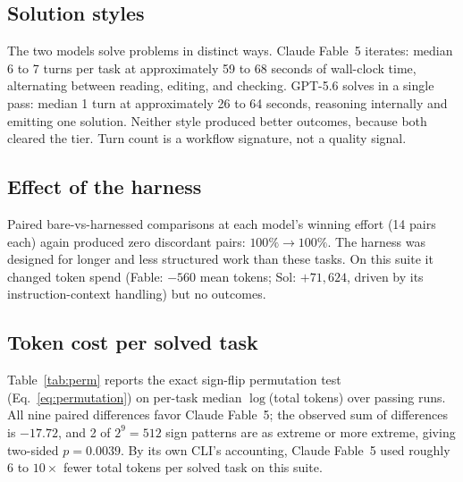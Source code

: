 \documentclass[11pt]{article}
\newcommand{\fable}{Claude Fable~5}
\newcommand{\sol}{GPT-5.6}
\begin{document}
\subsection{Solution styles}

The two models solve problems in distinct ways. \fable{} iterates: median
6 to 7 turns per task at approximately 59 to 68 seconds of wall-clock time,
alternating between reading, editing, and checking. \sol{} solves in a
single pass: median 1 turn at approximately 26 to 64 seconds, reasoning
internally and emitting one solution. Neither style produced better
outcomes, because both cleared the tier. Turn count is a workflow
signature, not a quality signal.

\subsection{Effect of the harness}

Paired bare-vs-harnessed comparisons at each model's winning effort (14
pairs each) again produced zero discordant pairs: $100\% \to 100\%$. The
harness was designed for longer and less structured work than these tasks.
On this suite it changed token spend (Fable: $-560$ mean tokens; Sol:
$+71{,}624$, driven by its instruction-context handling) but no outcomes.

\subsection{Token cost per solved task}
\label{sec:inputtokens}

Table~\ref{tab:perm} reports the exact sign-flip permutation test
(Eq.~\ref{eq:permutation}) on per-task median $\log$(total tokens) over
passing runs. All nine paired differences favor \fable{}; the observed sum
of differences is $-17.72$, and 2 of $2^9 = 512$ sign patterns are as
extreme or more extreme, giving two-sided $p = 0.0039$. By its own CLI's
accounting, \fable{} used roughly $6$ to $10\times$ fewer total tokens per
solved task on this suite.
\end{document}
